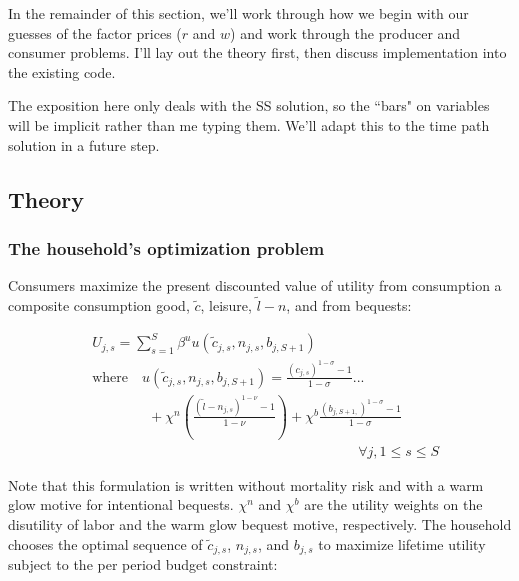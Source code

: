 \documentclass[letterpaper,12pt]{article}
\theoremstyle{definition}
\begin{document}
\begin{spacing}{1.5}
In the remainder of this section, we'll work through how we begin with our guesses of the factor prices ($r$ and $w$) and work through the producer and consumer problems.  I'll lay out the theory first, then discuss implementation into the existing code.  

The exposition here only deals with the SS solution, so the ``bars" on variables will be implicit rather than me typing them.  We'll adapt this to the time path solution in a future step.

\subsection*{Theory}

\subsubsection*{The household's optimization problem}

Consumers maximize the present discounted value of utility from consumption a composite consumption good, $\tilde{c}$, leisure, $\tilde{l}-n$, and from bequests:

    \begin{equation}\label{EqUtilMax}
      \begin{split}
        &U_{j,s} = \sum_{s=1}^{S}\beta^u  u\left(\tilde{c}_{j,s},n_{j,s},b_{j,S+1}\right) \\
        &\text{where} \quad u\left(\tilde{c}_{j,s},n_{j,s},b_{j,S+1}\right) = \frac{\left(c_{j,s}\right)^{1-\sigma} - 1}{1-\sigma} ... \\
        &\qquad\qquad + \chi^n\left(\frac{\left(\tilde{l}-n_{j,s}\right)^{1-\nu} - 1}{1-\nu} \right) + \chi^b\frac{\left(b_{j,S+1,}\right)^{1-\sigma} - 1}{1-\sigma} \\
        &\quad\quad\quad\quad\quad\quad\quad\quad\quad\quad\quad\quad\quad\quad\quad\quad\quad\quad\quad\forall j,1\leq s\leq S
      \end{split}
    \end{equation}
    
 Note that this formulation is written without mortality risk and with a warm glow motive for intentional bequests. $\chi^{n}$ and $\chi^{b}$ are the utility weights on the disutility of labor and the warm glow bequest motive, respectively.  The household chooses the optimal sequence of $\tilde{c}_{j,s}$, $n_{j,s}$, and $b_{j,s}$ to maximize lifetime utility subject to the per period budget constraint: 
 

\end{spacing}
\end{document}
